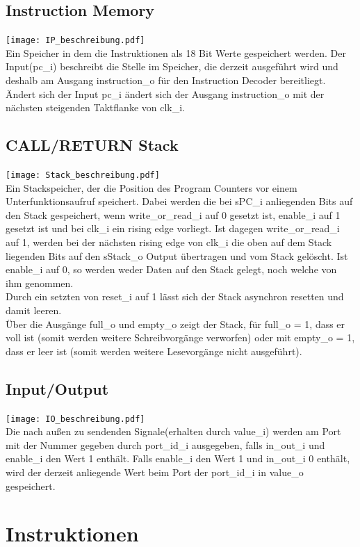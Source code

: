 \documentclass{scrartcl}
\begin{document}
\subsection{Instruction Memory}
\texttt{[image: IP\_beschreibung.pdf]}\\
Ein Speicher in dem die Instruktionen als 18 Bit Werte gespeichert werden. Der Input(pc\_i) beschreibt die Stelle im Speicher, die derzeit ausgeführt wird und deshalb am Ausgang instruction\_o für den Instruction Decoder bereitliegt. Ändert sich der Input pc\_i ändert sich der Ausgang instruction\_o mit der nächsten steigenden Taktflanke von clk\_i.
\subsection{CALL/RETURN Stack}
\texttt{[image: Stack\_beschreibung.pdf]}\\
Ein Stackspeicher, der die Position des Program Counters vor einem Unterfunktionsaufruf speichert. Dabei werden die bei sPC\_i anliegenden Bits auf den Stack gespeichert, wenn write\_or\_read\_i auf 0 gesetzt ist, enable\_i auf 1 gesetzt ist und bei clk\_i ein rising edge vorliegt. Ist dagegen write\_or\_read\_i auf 1, werden bei der nächsten rising edge von clk\_i die oben auf dem Stack liegenden Bits auf den sStack\_o Output übertragen und vom Stack gelöscht. Ist enable\_i auf 0, so werden weder Daten auf den Stack gelegt, noch welche von ihm genommen. \\
Durch ein setzten von reset\_i auf 1 lässt sich der Stack asynchron resetten und damit leeren. \\
Über die Ausgänge full\_o und empty\_o zeigt der Stack, für full\_o = 1, dass er voll ist (somit werden weitere Schreibvorgänge verworfen) oder mit empty\_o = 1, dass er leer ist (somit werden weitere Lesevorgänge nicht ausgeführt).

\subsection{Input/Output}
\texttt{[image: IO\_beschreibung.pdf]}\\
Die nach außen zu sendenden Signale(erhalten durch value\_i) werden am Port mit der Nummer gegeben durch port\_id\_i ausgegeben, falls in\_out\_i und enable\_i den Wert 1 enthält. Falls enable\_i den Wert 1 und in\_out\_i 0 enthält, wird der derzeit anliegende Wert beim Port der port\_id\_i in value\_o gespeichert.
\newpage
\section{Instruktionen}
\end{document}
